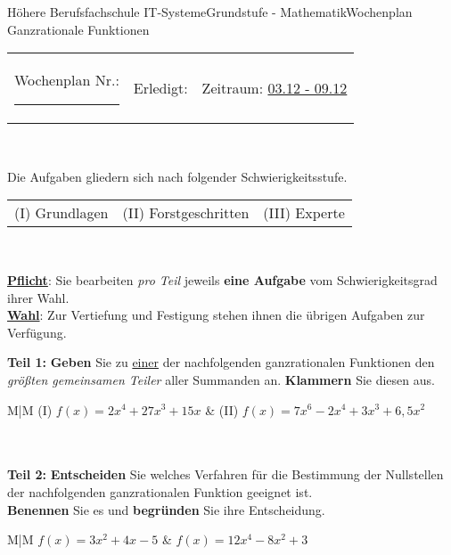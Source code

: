 \documentclass[oneside,openany,headings=optiontotoc,11pt,numbers=noenddot]{scrreprt}
\begin{document}
	\begin{worksheet}{Höhere Berufsfachschule IT-Systeme}{Grundstufe - Mathematik}{Wochenplan Ganzrationale Funktionen}
		\noindent
		\begin{tabularx}{\textwidth}{XXl}
			Wochenplan Nr.: \rule{0.15\textwidth}{1pt} & Erledigt: & Zeitraum: \underline{03.12 - 09.12}
		\end{tabularx}\\
		\par\noindent
		Die Aufgaben gliedern sich nach folgender Schwierigkeitsstufe.\\
		\begin{tabularx}{\textwidth}{XXX}
			(I) Grundlagen & (II) Forstgeschritten & (III) Experte
		\end{tabularx}\\
		\par\noindent
		\textbf{\underline{Pflicht}}: Sie bearbeiten \textit{pro Teil} jeweils \textbf{eine Aufgabe} vom Schwierigkeitsgrad ihrer Wahl.\\
		\underline{\textbf{Wahl}}: Zur Vertiefung und Festigung stehen ihnen die übrigen Aufgaben zur Verfügung.
		\begin{framed}
			\noindent
			\textbf{Teil 1:} \textbf{Geben} Sie zu \underline{einer} der nachfolgenden ganzrationalen Funktionen den \textit{größten gemeinsamen Teiler} aller Summanden an. \textbf{Klammern} Sie diesen aus.\\
			\par\noindent
			\begin{tabularx}{\textwidth}{M|M}
				(I) \(f(x) = 2x^4 + 27x^3 + 15x\) & (II) \(f(x) = 7x^6 - 2x^4 + 3x^3 + 6,5x^2\)\\
				\\
				\hline
				\\
			\end{tabularx}
		\end{framed}
		\begin{framed}
			\noindent
			\textbf{Teil 2:} \textbf{Entscheiden} Sie welches Verfahren für die Bestimmung der Nullstellen der nachfolgenden ganzrationalen Funktion geeignet ist.\\
			\textbf{Benennen} Sie es und \textbf{begründen} Sie ihre Entscheidung.\\
			\par\noindent
			\begin{tabularx}{\textwidth}{M|M}
				\(f(x) = 3x^2 + 4x -5\) & \(f(x) = 12x^4 - 8x^2 + 3\)\\

\end{tabularx}
\end{framed}
\end{worksheet}
\end{document}
